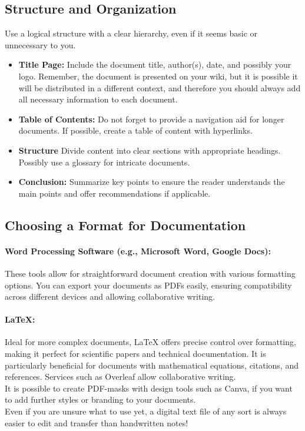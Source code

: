 \subsection*{Structure and Organization}
Use a logical structure with a clear hierarchy, even if it seems basic or unnecessary to you.
\begin{itemize}
    \item \textbf{Title Page:} Include the document title, author(s), date, and possibly your logo.
    Remember, the document is presented on your wiki, but it is possible it will be distributed in a different context, and therefore you should always add all necessary information to each document.
    \item \textbf{Table of Contents:} Do not forget to provide a navigation aid for longer documents.
     If possible, create a table of content with hyperlinks.
    \item \textbf{Structure} Divide content into clear sections with appropriate headings.
    Possibly use a glossary for intricate documents.
    \item \textbf{Conclusion:} Summarize key points to ensure the reader understands the main points and offer recommendations if applicable.
\end{itemize}


\subsection*{Choosing a Format for Documentation}
\paragraph{Word Processing Software (e.g., Microsoft Word, Google Docs):} These tools allow for straightforward document creation with various formatting options.
You can export your documents as PDFs easily, ensuring compatibility across different devices and allowing collaborative writing.
\paragraph{LaTeX:} Ideal for more complex documents, LaTeX offers precise control over formatting, making it perfect for scientific papers and technical documentation.
It is particularly beneficial for documents with mathematical equations, citations, and references.
Services such as Overleaf allow collaborative writing. \\  \newline
It is possible to create PDF-masks with design tools such as Canva, if you want to add further styles or branding to your documents.\\ \newline
Even if you are unsure what to use yet, a digital text file of any sort is always easier to edit and transfer than handwritten notes!



